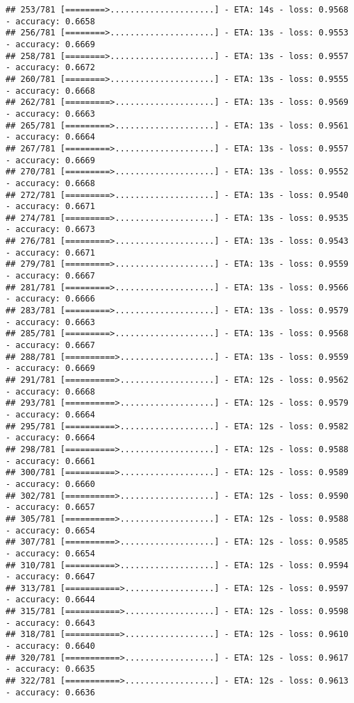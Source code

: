 \documentclass[
]{article}
\begin{document}
\begin{verbatim}
## 253/781 [========>.....................] - ETA: 14s - loss: 0.9568 - accuracy: 0.6658
## 256/781 [========>.....................] - ETA: 13s - loss: 0.9553 - accuracy: 0.6669
## 258/781 [========>.....................] - ETA: 13s - loss: 0.9557 - accuracy: 0.6672
## 260/781 [========>.....................] - ETA: 13s - loss: 0.9555 - accuracy: 0.6668
## 262/781 [=========>....................] - ETA: 13s - loss: 0.9569 - accuracy: 0.6663
## 265/781 [=========>....................] - ETA: 13s - loss: 0.9561 - accuracy: 0.6664
## 267/781 [=========>....................] - ETA: 13s - loss: 0.9557 - accuracy: 0.6669
## 270/781 [=========>....................] - ETA: 13s - loss: 0.9552 - accuracy: 0.6668
## 272/781 [=========>....................] - ETA: 13s - loss: 0.9540 - accuracy: 0.6671
## 274/781 [=========>....................] - ETA: 13s - loss: 0.9535 - accuracy: 0.6673
## 276/781 [=========>....................] - ETA: 13s - loss: 0.9543 - accuracy: 0.6671
## 279/781 [=========>....................] - ETA: 13s - loss: 0.9559 - accuracy: 0.6667
## 281/781 [=========>....................] - ETA: 13s - loss: 0.9566 - accuracy: 0.6666
## 283/781 [=========>....................] - ETA: 13s - loss: 0.9579 - accuracy: 0.6663
## 285/781 [=========>....................] - ETA: 13s - loss: 0.9568 - accuracy: 0.6667
## 288/781 [==========>...................] - ETA: 13s - loss: 0.9559 - accuracy: 0.6669
## 291/781 [==========>...................] - ETA: 12s - loss: 0.9562 - accuracy: 0.6668
## 293/781 [==========>...................] - ETA: 12s - loss: 0.9579 - accuracy: 0.6664
## 295/781 [==========>...................] - ETA: 12s - loss: 0.9582 - accuracy: 0.6664
## 298/781 [==========>...................] - ETA: 12s - loss: 0.9588 - accuracy: 0.6661
## 300/781 [==========>...................] - ETA: 12s - loss: 0.9589 - accuracy: 0.6660
## 302/781 [==========>...................] - ETA: 12s - loss: 0.9590 - accuracy: 0.6657
## 305/781 [==========>...................] - ETA: 12s - loss: 0.9588 - accuracy: 0.6654
## 307/781 [==========>...................] - ETA: 12s - loss: 0.9585 - accuracy: 0.6654
## 310/781 [==========>...................] - ETA: 12s - loss: 0.9594 - accuracy: 0.6647
## 313/781 [===========>..................] - ETA: 12s - loss: 0.9597 - accuracy: 0.6644
## 315/781 [===========>..................] - ETA: 12s - loss: 0.9598 - accuracy: 0.6643
## 318/781 [===========>..................] - ETA: 12s - loss: 0.9610 - accuracy: 0.6640
## 320/781 [===========>..................] - ETA: 12s - loss: 0.9617 - accuracy: 0.6635
## 322/781 [===========>..................] - ETA: 12s - loss: 0.9613 - accuracy: 0.6636

\end{verbatim}
\end{document}
